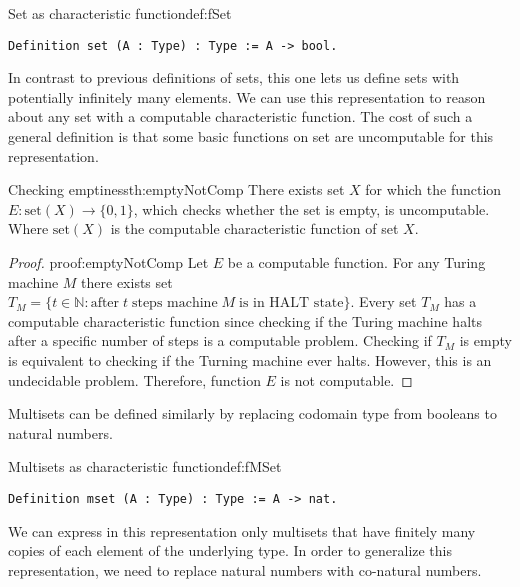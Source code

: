 \begin{defi}{Set as characteristic function}{def:fSet}
\begin{verbatim}
Definition set (A : Type) : Type := A -> bool.
\end{verbatim}
\end{defi}
In contrast to previous definitions of sets, this one lets us define sets with potentially infinitely many elements. We can use this representation to reason about any set with a computable characteristic function. The cost of such a general definition is that some basic functions on set are uncomputable for this representation.
\begin{theo}{Checking emptiness}{th:emptyNotComp}
There exists set $X$ for which the function $E : \textrm{set}(X) \rightarrow \{0, 1\}$, which checks whether the set is empty, is uncomputable. Where $\textrm{set}(X)$ is the computable characteristic function of set $X$. 
\end{theo}
\begin{proof}{}{proof:emptyNotComp}
Let $E$ be a computable function. For any Turing machine $M$ there exists set $T_M = \{t \in \mathbb{N} : \textrm{after} \; t \; \textrm{steps machine} \; M \; \textrm{is in HALT state}\}$. Every set $T_M$ has a computable characteristic function since checking if the Turing machine halts after a specific number of steps is a computable problem. Checking if $T_M$ is empty is equivalent to checking if the Turning machine ever halts. However, this is an undecidable problem. Therefore, function $E$ is not computable. \phantom{dasd} \contradiction
\end{proof}
Multisets can be defined similarly by replacing codomain type from booleans to natural numbers.
\begin{defi}{Multisets as characteristic function}{def:fMSet}
\begin{verbatim}
Definition mset (A : Type) : Type := A -> nat.
\end{verbatim}
\end{defi}
We can express in this representation only multisets that have finitely many copies of each element of the underlying type. In order to generalize this representation, we need to replace natural numbers with co-natural numbers.
